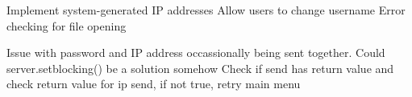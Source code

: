 Implement system-generated IP addresses
Allow users to change username
Error checking for file opening

Issue with password and IP address occassionally being sent together. 
    Could server.setblocking() be a solution somehow
    Check if send has return value and check return value for ip send, if not true, retry main menu